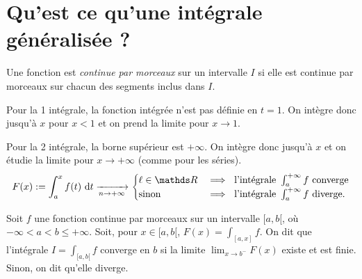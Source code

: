 \section{Qu'est ce qu'une intégrale généralisée ?}

\begin{defn}
	Une fonction est {\it continue par morceaux}\/ sur un intervalle $I$\/ si elle est continue par morceaux sur chacun des segments inclus dans $I$.
\end{defn}

Pour la 1 intégrale, la fonction intégrée n'est pas définie en $t = 1$. On intègre donc jusqu'à $x$\/ pour $x < 1$\/ et on prend la limite pour $x \to 1$.

Pour la 2 intégrale, la borne supérieur est $+\infty$. On intègre donc jusqu'à $x$\/ et on étudie la limite pour $x \to +\infty$ (comme pour les séries). \[
	F(x) := \int_{a}^{x} f(t)~\mathrm{d}t \tendsto{n\to +\infty} \begin{cases}
		\ell \in \R &\implies \text{ l'intégrale } \int_{a}^{+\infty} f \text{ converge}\\
		\text{sinon } &\implies \text{ l'intégrale } \int_{a}^{+\infty} f \text{ diverge}.\\
	\end{cases}
\]

\begin{defn}
	Soit $f$\/ une fonction continue par morceaux sur un intervalle $[a,b[$, où $-\infty < a < b \le +\infty$. Soit, pour $x \in [a,b[$, $F(x) = \int_{[a,x]}f$. On dit que l'intégrale $I = \int_{[a,b[} f$\/ converge en $b$\/ si la limite $\lim_{x\to b^-} F(x)$\/ existe et est finie. Sinon, on dit qu'elle diverge.
\end{defn}

